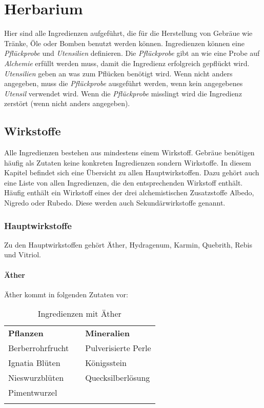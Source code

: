 {\let\clearpage\relax\chapter{Herbarium}}
Hier sind alle Ingredienzen aufgeführt, die für die Herstellung von Gebräue wie Tränke, Öle oder Bomben benutzt werden können. Ingredienzen können eine \textit{Pflückprobe} und \textit{Utensilien} definieren. Die \textit{Pflückprobe} gibt an wie eine Probe auf \textit{Alchemie} erfüllt werden muss, damit die Ingredienz erfolgreich gepflückt wird. \textit{Utensilien} geben an was zum Pflücken benötigt wird. Wenn nicht anders angegeben, muss die \textit{Pflückprobe} ausgeführt werden, wenn kein angegebenes \textit{Utensil} verwendet wird. Wenn die \textit{Pflückprobe} misslingt wird die Ingredienz zerstört (wenn nicht anders angegeben).

\section{Wirkstoffe}
Alle Ingredienzen bestehen aus mindestens einem Wirkstoff. Gebräue benötigen häufig als Zutaten keine konkreten Ingredienzen sondern Wirkstoffe. In diesem Kapitel befindet sich eine Übersicht zu allen Hauptwirkstoffen. Dazu gehört auch eine Liste von allen Ingredienzen, die den entsprechenden Wirkstoff enthält. Häufig enthält ein Wirkstoff eines der drei alchemistischen Zusatzstoffe Albedo, Nigredo oder Rubedo. Diese werden auch Sekundärwirkstoffe genannt. 

\subsection{Hauptwirkstoffe}
Zu den Hauptwirkstoffen gehört Äther, Hydragenum, Karmin, Quebrith, Rebis und Vitriol. 

\subsubsection{Äther}
Äther kommt in folgenden Zutaten vor:

\begin{longtable}{p{5cm}p{2cm}p{5cm}}
\textbf{Pflanzen} & & \textbf{Mineralien} \\ \cline{1-1} \cline{3-3}
Berberrohrfrucht & & Pulverisierte Perle \\ 
Ignatia Blüten & & Königsstein \\ 
Nieswurzblüten  & & Quecksilberlösung \\ 
Pimentwurzel & &  \\ 

\caption{Ingredienzen mit Äther}
\label{tab:ingredienzen_mit_aether}
\end{longtable}

